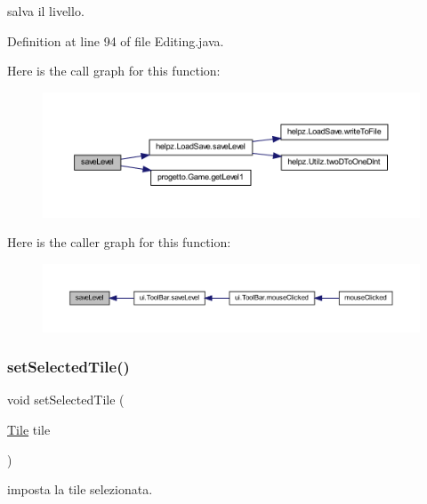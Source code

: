 salva il livello. 



Definition at line 94 of file Editing.\+java.

Here is the call graph for this function\+:\nopagebreak
\begin{figure}[H]
\begin{center}
\leavevmode
\includegraphics[width=350pt]{classscenes_1_1_editing_af1c1bf274cd89c18726a992a073a7c6d_cgraph}
\end{center}
\end{figure}
Here is the caller graph for this function\+:\nopagebreak
\begin{figure}[H]
\begin{center}
\leavevmode
\includegraphics[width=350pt]{classscenes_1_1_editing_af1c1bf274cd89c18726a992a073a7c6d_icgraph}
\end{center}
\end{figure}
\mbox{\label{classscenes_1_1_editing_adaa2adb9d249f9b235fb9bb96aed4924}} 
\subsubsection{\texorpdfstring{set\+Selected\+Tile()}{setSelectedTile()}}
{\footnotesize\ttfamily void set\+Selected\+Tile (\begin{DoxyParamCaption}\item[{\hyperlink{classobjects_1_1_tile}{Tile}}]{tile }\end{DoxyParamCaption})}



imposta la tile selezionata. 


